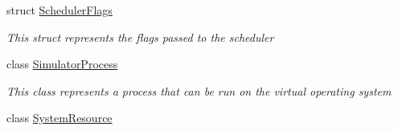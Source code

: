 \begin{DoxyCompactItemize}
struct \hyperlink{struct_c_p_u___o_s___simulator_1_1_operating___system_1_1_scheduler_flags}{Scheduler\+Flags}
\begin{DoxyCompactList}\small\item\em This struct represents the flags passed to the scheduler \end{DoxyCompactList}\item 
class \hyperlink{class_c_p_u___o_s___simulator_1_1_operating___system_1_1_simulator_process}{Simulator\+Process}
\begin{DoxyCompactList}\small\item\em This class represents a process that can be run on the virtual operating system \end{DoxyCompactList}\item 
class \hyperlink{class_c_p_u___o_s___simulator_1_1_operating___system_1_1_system_resource}{System\+Resource}
\end{DoxyCompactItemize}
